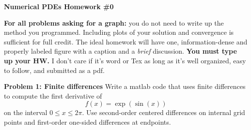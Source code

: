 \documentclass[12pt,answers]{exam}
\begin{document}
\begin{center}
\textbf{Numerical PDEs Homework \#0}\\
\end{center}

\noindent \textbf{For all problems asking for a graph:} you do not need to write up the method you programmed. Including plots of your solution and convergence is sufficient for full credit. The ideal homework will have one, information-dense and properly labeled figure with a caption and a \textit{brief} discussion. \textbf{You must type up your HW.} I don't care if it's word or Tex as long as it's well organized, easy to follow, and submitted as a pdf. 

\vspace{0.3cm}

\noindent \textbf{Problem 1: Finite differences}
Write a matlab code that uses finite differences to compute the first derivative of
$$f(x) = \exp(\sin(x))$$
on the interval $0 \leq x \leq 2\pi$. Use second-order centered differences on internal grid points and first-order one-sided differences at endpoints. 
\end{document}
